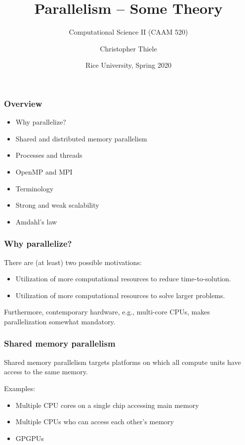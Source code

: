 \documentclass[12pt,t]{beamer}
\begin{document}
  \title{Parallelism -- Some Theory}
  \subtitle{Computational Science II (CAAM 520)}
  \author{Christopher Thiele}
  \date{Rice University, Spring 2020}

  \begin{frame}
    \titlepage
  \end{frame}


  \begin{frame}[fragile]
    \frametitle{Overview}

    \begin{itemize}
      \item Why parallelize?
      \item Shared and distributed memory parallelism
      \item Processes and threads
      \item OpenMP and MPI
      \item Terminology
      \item Strong and weak scalability
      \item Amdahl's law
    \end{itemize}
  \end{frame}

  \begin{frame}[fragile]
    \frametitle{Why parallelize?}

    There are (at least) two possible motivations:
    \begin{itemize}
      \item Utilization of more computational resources to reduce time-to-solution.
      \item Utilization of more computational resources to solve larger problems.
    \end{itemize}

    Furthermore, contemporary hardware, e.g., multi-core CPUs, makes parallelization somewhat mandatory.
  \end{frame}

  \begin{frame}[fragile]
    \frametitle{Shared memory parallelism}

    Shared memory parallelism targets platforms on which all compute units have access to the same memory.

    Examples:
    \begin{itemize}
      \item Multiple CPU cores on a single chip accessing main memory
      \item Multiple CPUs who can access each other's memory
      \item GPGPUs
    \end{itemize}
  \end{frame}
\end{document}
